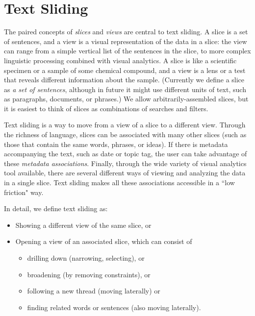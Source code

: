 \documentclass{sig-alternate}
\begin{document}
\section{Text Sliding}

The paired concepts of \emph{slices} and \emph{views} are central to text sliding. A slice is a set of sentences, and a view is a visual representation of the data in a slice: the view can range from a simple vertical list of the sentences in the slice, to more complex linguistic processing combined with visual analytics.  A slice is like a scientific specimen or a sample of some chemical compound,  and a view is a lens or a test that reveals different information about the sample.
(Currently we define a slice as \emph{a set of sentences}, although in future it might use different units of text, such as paragraphs, documents, or phrases.) We allow arbitrarily-assembled slices, but it is easiest to think of slices as combinations of searches and filters.  


Text sliding is a way to move from a view of a slice to a different view. Through the richness of language, slices can be associated with many other slices (such as those that contain the same  words, phrases, or ideas). If there is metadata accompanying the text, such as date or topic tag, the user can take advantage of these  \emph{metadata associations}.  Finally, through the wide variety of visual analytics tool available, there are several different ways of viewing and analyzing the data in a single slice. Text sliding makes all these associations accessible in a ``low friction" way.

In detail, we define text sliding as:
\begin{itemize}
	\item Showing a different view of the same slice, or
	\item Opening a  view of an associated slice, which can consist of
	\begin{itemize}
	  \item drilling down (narrowing, selecting), or
	  \item broadening (by removing constraints), or
	  \item following a new thread (moving laterally) or
	  \item finding related words or sentences  (also moving laterally).
	 \end{itemize}
\end{itemize}
\end{document}
